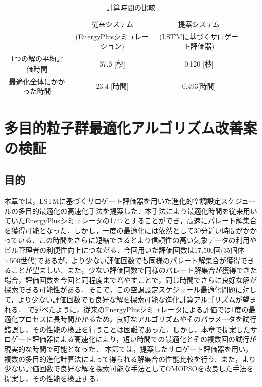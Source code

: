 \begin{table}[t]
  {\footnotesize
    \begin{center}
      \caption{計算時間の比較}
      \label{tab::surrogate_result_time}
      \begin{tabular}{c|cccc}
        \hline
                                 & 従来システム                 & 提案システム                   \\
                                 & (EnergyPlusシミュレーション) & (LSTMに基づくサロゲート評価器) \\
        \hline \hline
        1つの解の平均評価時間    & 37.3 [秒]                    & 0.120 [秒]                     \\
        最適化全体にかかった時間 & 23.4 [時間]                  & 0.493[時間]                    \\
        \hline
      \end{tabular}
    \end{center}
  }
\end{table}

\section{多目的粒子群最適化アルゴリズム改善案の検証}
\subsection{目的}

本章では，LSTMに基づくサロゲート評価器を用いた進化的空調設定スケジュールの多目的最適化の高速化手法を提案した．本手法により最適化時間を従来用いていたEnergyPlusシミュレータの1/47とすることができ，高速にパレート解集合を獲得可能となった．しかし，一度の最適化には依然として30分近い時間がかかっている．この時間をさらに短縮できるとより信頼性の高い気象データの利用やビル管理者の利便性向上につながる．今回用いた評価回数は17,500回(35個体×500世代)であるが，より少ない評価回数でも同様のパレート解集合が獲得できることが望ましい．また，少ない評価回数で同様のパレート解集合が獲得できた場合，評価回数を今回と同程度まで増やすことで，同じ時間でさらに良好な解が探索できる可能性がある．そこで，この空調設定スケジュール最適化問題に対して，より少ない評価回数でも良好な解を探索可能な進化計算アルゴリズムが望まれる．
で述べたように，従来のEnergyPlusシミュレータによる評価では1度の最適化プロセスに長時間かかるため，良好なアルゴリズムやそのパラメータを試行錯誤し，その性能の検証を行うことは困難であった．しかし，本章で提案したサロゲート評価器による高速化により，短い時間での最適化とその複数回の試行が現実的な時間で可能となった．
本節では，提案したサロゲート評価器を用い，複数の多目的進化計算法によって得られる解集合の性能比較を行う．また，より少ない評価回数で良好な解を探索可能な手法としてOMOPSOを改良した手法を提案し，その性能を検証する．


